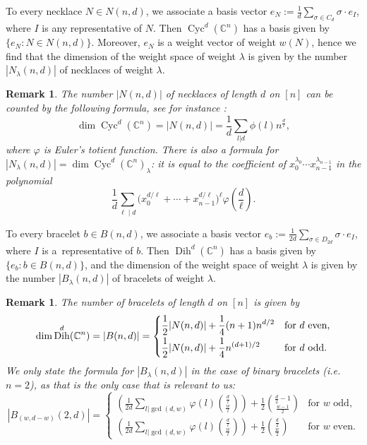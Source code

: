 \documentclass[pdftex]{sigma}
\numberwithin{equation}{section}
\newtheorem{Remark}[Theorem]{Remark}
\newcommand{\CC}{\mathbb{C}}
\DeclareMathOperator{\Cyc}{Cyc}
\DeclareMathOperator{\Dih}{Dih}
\begin{document}
 To every necklace $N\in N(n,d)$, we associate a basis vector $e_N := \frac{1}{d}\sum_{\sigma \in C_d}{\sigma \cdot e_I}$, where $I$ is any representative of $N$. Then $\Cyc^d(\CC^n)$ has a basis given by $\{e_N\colon N\in N(n,d)\}$.
 Moreover, $e_N$ is a weight vector of weight $w(N)$, hence we find that the dimension of the weight space of weight $\lambda$ is given by the number $|N_{\lambda}(n,d)|$ of necklaces of weight $\lambda$.

 \begin{Remark}
 The number $|N(n,d)|$ of necklaces of length $d$ on $[n]$ can be counted by the following formula, see for instance \cite[Theorem~7.10]{Stanley}:
 \begin{equation}\label{dimCyc}
        \dim \Cyc^d({\mathbb C}^n)= |N(n,d)|= \frac{1}{d}\sum_{l|d}\phi(l)n^{\frac{d}{l}},
 \end{equation}
 where $\varphi$ is Euler's totient function.
 There is also a formula for $|N_{\lambda}(n,d)| =\dim \Cyc^d({\mathbb C}^n)_{\lambda}$: it is equal to the coefficient of    $x_0^{\lambda_0} \cdots x_{n-1}^{\lambda_{n-1}}$ in the polynomial
\begin{equation}\label{dimCyc2}
\frac{1}{d}\sum_{\ell \mid d}{\big(x_0^{d/\ell}+\cdots+x_{n-1}^{d/\ell}\big)^{\ell}}\varphi\left(\frac{d}{\ell}\right).
\end{equation}
 \end{Remark}
  To every bracelet $b\in B(n,d)$, we associate a basis vector $e_b := \frac{1}{2d}\sum_{\sigma \in D_{2d}}{\sigma \cdot e_I}$, where $I$ is a~representative of $b$. Then $\Dih^d(\CC^n)$ has a basis given by $\{e_b\colon b\in B(n,d)\}$,
  and the dimension of the weight space of weight $\lambda$ is given by the number $|B_{\lambda}(n,d)|$ of bracelets of weight $\lambda$.
  \begin{Remark}
  The number of bracelets of length $d$ on $[n]$ is given by
  \begin{equation}\label{dimDih}
        \dim \Dih^d({\mathbb C}^n)= |B(n,d)|= \begin{cases}
               \displaystyle \frac{1}{2}|N(n,d)| + \frac{1}{4}(n+1)n^{d/2} & \text{for } d \text{ even,}\vspace{1mm}\\
              \displaystyle  \frac{1}{2}|N(n,d)| + \frac{1}{4}n^{(d+1)/2} & \text{for } d \text{ odd.}
        \end{cases}
 \end{equation}
  We only state the formula for $|B_{\lambda}(n,d)|$ in the case of binary bracelets (i.e.\ $n=2$), as that is the only case that is relevant to us:
 \begin{equation}\label{dimDih2}
|B_{(w,d-w)}(2,d)|=\begin{cases}
\displaystyle \left(\frac{1}{2d}\sum_{l \vert \gcd(d,w)}{\varphi(l)\binom{\frac{d}{l}}{\frac{w}{l}}}\right) + \frac{1}{2}\binom{\frac{d}{2}-1}{\frac{w-1}{2}} & \text{for $w$ odd,} \\
\displaystyle \left(\frac{1}{2d}\sum_{l \vert \gcd(d,w)}{\varphi(l)\binom{\frac{d}{l}}{\frac{w}{l}}}\right) + \frac{1}{2}\binom{\frac{d}{2}}{\frac{w}{2}} & \text{for $w$ even.}
\end{cases}
\end{equation}
\end{Remark}
\end{document}
